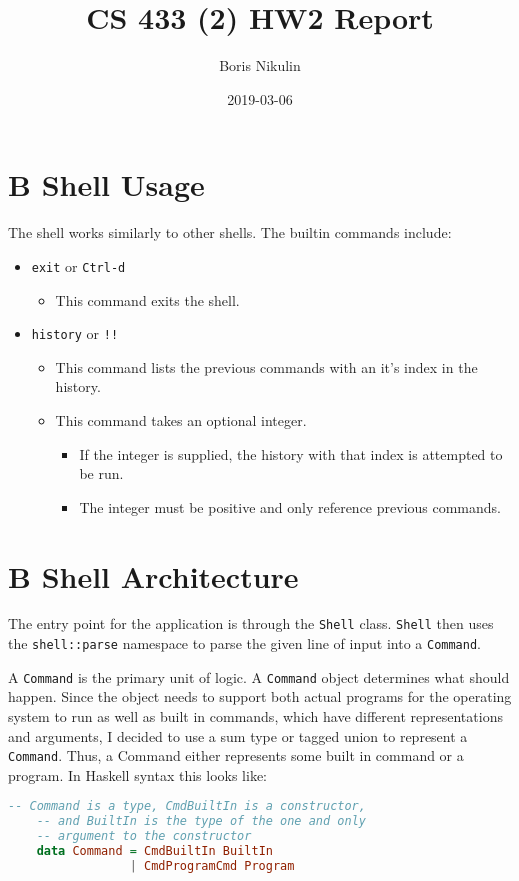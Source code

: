 \documentclass{article}
\title{CS 433 (2) HW2 Report}
\date{2019-03-06}
\author{Boris Nikulin}
\begin{document}
\maketitle
\tableofcontents

\section{B Shell Usage}

The shell works similarly to other shells.
The builtin commands include:

\begin{itemize}
	\item
		\texttt{exit} or \texttt{Ctrl-d}
		\begin{itemize}
			\item This command exits the shell.
		\end{itemize}
	\item
		\texttt{history} or \texttt{!!}
		\begin{itemize}
			\item This command lists the previous commands with an it's index in the history.
			\item This command takes an optional integer.
				\begin{itemize}
					\item
						If the integer is supplied, the history with that index is attempted to be run.
					\item
						The integer must be positive and only reference previous commands.
				\end{itemize}
		\end{itemize}
\end{itemize}

\section{B Shell Architecture}

The entry point for the application is through the \texttt{Shell} class.
\texttt{Shell} then uses the \texttt{shell::parse} namespace to parse the given line of input into a \texttt{Command}.

A \texttt{Command} is the primary unit of logic.
A \texttt{Command} object determines what should happen.
Since the object needs to support both actual programs for the operating system to run as well as built in commands,
which have different representations and arguments,
I decided to use a sum type or tagged union to represent a \texttt{Command}.
Thus, a Command either represents some built in command or a program.
In Haskell syntax this looks like:
\begin{lstlisting}[language=Haskell]
	-- Command is a type, CmdBuiltIn is a constructor,
	-- and BuiltIn is the type of the one and only
	-- argument to the constructor
	data Command = CmdBuiltIn BuiltIn
	             | CmdProgramCmd Program
\end{lstlisting}
\end{document}
